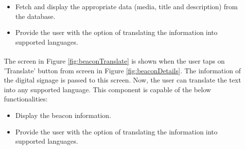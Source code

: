 \documentclass[12pt]{article}
\begin{document}
\begin{itemize}
	\item Fetch and display the appropriate data (media, title and description) from the database.
	\item Provide the user with the option of translating the information into supported languages.
\end{itemize}

\paragraph{}The screen in Figure \ref{fig:beaconTranslate} is shown when the user taps on 'Translate' button from screen in Figure \ref{fig:beaconDetails}. The information of the digital signage is passed to this screen. Now, the user can translate the text into any supported language. This component is capable of the below functionalities:

\begin{itemize}
	\item Display the beacon information.
	\item Provide the user with the option of translating the information into supported languages.
\end{itemize}
\end{document}
